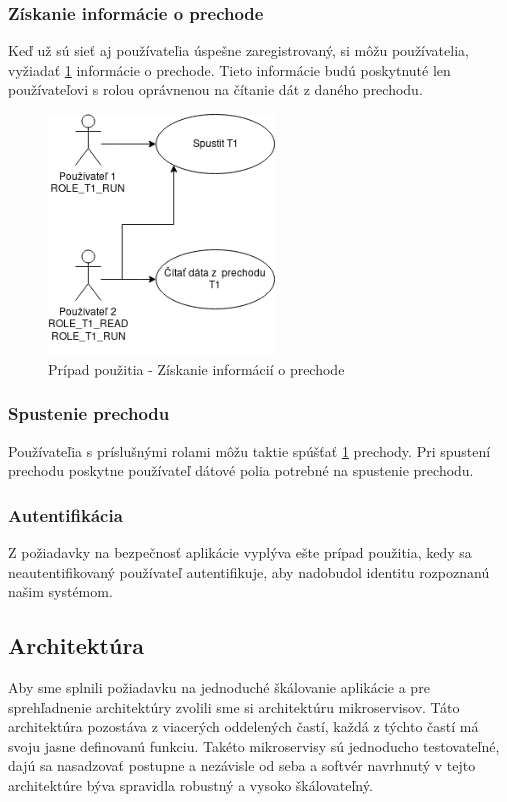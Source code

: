 \subsubsection{Získanie informácie o prechode}
Keď už sú sieť aj používateľia úspešne zaregistrovaný, si môžu používatelia, vyžiadať \ref{usecase2} informácie o prechode. Tieto informácie budú poskytnuté len používateľovi s rolou oprávnenou na čítanie dát z daného prechodu.

\begin{figure}[!htbp]
	\centering
	\includegraphics[width=6cm]{img/dp_usecase_2_read_run.png}
	\caption{Prípad použitia - Získanie informácií o prechode}
	\label{usecase2}
\end{figure} 

\subsubsection{Spustenie prechodu}
Používateľia s príslušnými rolami môžu taktie spúšťať \ref{usecase2} prechody. Pri spustení prechodu poskytne používateľ dátové polia potrebné na spustenie prechodu. 

\subsubsection{Autentifikácia}
Z požiadavky na bezpečnosť aplikácie vyplýva ešte prípad použitia, kedy sa neautentifikovaný používateľ autentifikuje, aby nadobudol identitu rozpoznanú našim systémom. 



\subsection{Architektúra} 

Aby sme splnili požiadavku na jednoduché škálovanie aplikácie a pre sprehľadnenie architektúry zvolili sme si architektúru mikroservisov. Táto architektúra pozostáva z viacerých oddelených častí, každá z týchto častí má svoju jasne definovanú funkciu. Takéto mikroservisy sú jednoducho testovateľné, dajú sa nasadzovať postupne a nezávisle od seba a softvér navrhnutý v tejto architektúre býva spravidla robustný a vysoko škálovateľný.  

